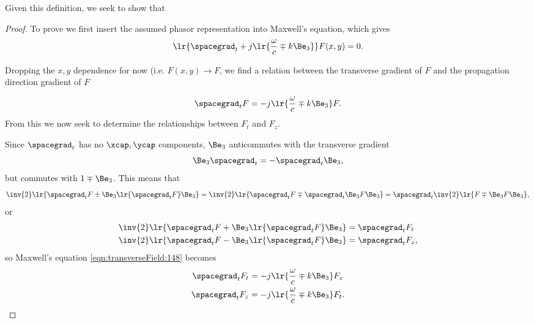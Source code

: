 Given this definition, we seek to show that

\begin{proof}
To prove we first insert the assumed phasor representation into Maxwell's equation, which gives
\begin{equation}\label{eqn:transverseField:summaryMax2}
\lr{\spacegrad_t + j \lr{ \frac{\omega}{c} \mp k \Be_3 } } F(x,y) = 0.
\end{equation}

Dropping the \( x, y \) dependence for now (i.e.  \( F(x, y) \rightarrow F \), we find a relation between the transverse gradient of \( F \) and the propagation direction gradient of \( F \)

\begin{equation}\label{eqn:transverseField:148}
\spacegrad_t F = - j \lr{ \frac{\omega}{c} \mp k \Be_3 } F.
\end{equation}
From this we now seek to determine the relationships between \( F_t \) and \( F_z \).

Since \( \spacegrad_t \) has no \( \xcap, \ycap \) components, \( \Be_3 \) anticommutes with the transverse gradient
\begin{equation}\label{eqn:transverseField:168}
\Be_3 \spacegrad_t = - \spacegrad_t \Be_3,
\end{equation}
but commutes with \( 1 \mp \Be_3 \).
This means that
\begin{dmath}\label{eqn:transverseField:188}
\inv{2} \lr{ \spacegrad_t F \pm \Be_3 \lr{ \spacegrad_t F } \Be_3 }
=
\inv{2} \lr{ \spacegrad_t F \mp \spacegrad_t \Be_3 F \Be_3 }
=
\spacegrad_t
\inv{2} \lr{ F \mp \Be_3 F \Be_3 },
\end{dmath}
or
\begin{equation}\label{eqn:transverseField:208}
\begin{aligned}
\inv{2} \lr{ \spacegrad_t F + \Be_3 \lr{ \spacegrad_t F } \Be_3 } &= \spacegrad_t F_t \\
\inv{2} \lr{ \spacegrad_t F - \Be_3 \lr{ \spacegrad_t F } \Be_3 } &= \spacegrad_t F_z,
\end{aligned}
\end{equation}
so Maxwell's equation \cref{eqn:transverseField:148} becomes
\begin{equation}\label{eqn:transverseField:228}
\begin{aligned}
\spacegrad_t F_t &= - j \lr{ \frac{\omega}{c} \mp k \Be_3 } F_z \\
\spacegrad_t F_z &= - j \lr{ \frac{\omega}{c} \mp k \Be_3 } F_t.
\end{aligned}
\end{equation}


\end{proof}
